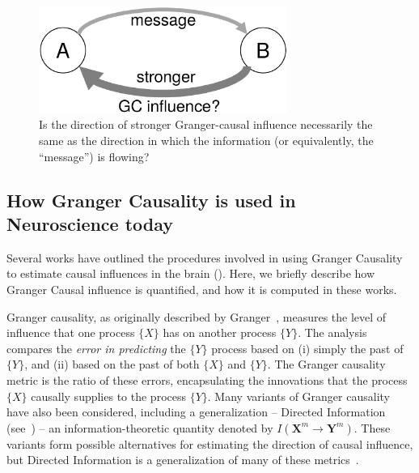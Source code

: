\documentclass[letterpaper, 10pt, conference]{ieeeconf}
\newcommand{\m}[1]{\mathbf{#1}^m}
\begin{document}
\begin{figure}[htbp] %
	\centering
	\includegraphics[width=3.2in]{gc-vs-message}
	\caption{Is the direction of stronger Granger-causal influence necessarily the same as the direction in which the information (or equivalently, the ``message'') is flowing?}
	\label{fig:gc-vs-message}
\end{figure}


\subsection{How Granger Causality is used in Neuroscience today}
\label{sec:gc-used-in-neuroscience}

Several works have outlined the procedures involved in using Granger Causality to estimate causal influences in the brain (\cite{bernasconi2000bidirectional,Brovelli2004BetaOscillations,Ding2000ShortWindow,Roebroeck2005MappingDirected,Bressler2011WienerGranger,Barnett2014MVGC,Ding2006GrangerCausality}). Here, we briefly describe how Granger Causal influence is quantified, and how it is computed in these works.

Granger causality, as originally described by Granger~\cite{Granger1969InvestigatingCausal}, measures the level of influence that one process $\{X\}$ has on another process $\{Y\}$. The analysis compares the \emph{error in predicting} the $\{Y\}$ process based on (i) simply the past of $\{Y\}$, and (ii) based on the past of both $\{X\}$ and $\{Y\}$. The Granger causality metric is the ratio of these errors, encapsulating the innovations that the process $\{X\}$ causally supplies to the process $\{Y\}$. Many variants of Granger causality have also been considered, including a generalization -- Directed Information (see~\cite{MasseyCausality,quinn,weissman}) -- an information-theoretic quantity denoted by $I(\m{X}\to\m{Y})$. These variants form possible alternatives for estimating the direction of causal influence, but Directed Information is a generalization of many of these metrics~\cite{quinn}.
\end{document}
